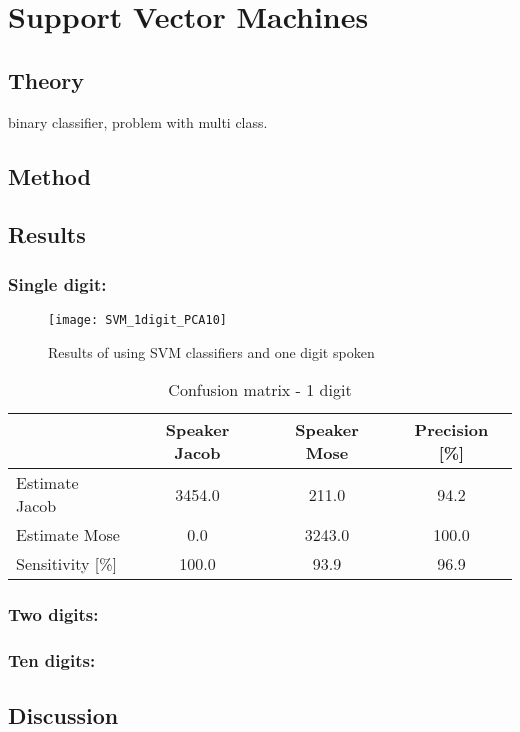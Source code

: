\chapter{Support Vector Machines}
\section{Theory}
binary classifier, problem with multi class. 
\section{Method}

\section{Results}

\subsection{Single digit:}

\begin{figure}[H]
\centering
\texttt{[image: SVM\_1digit\_PCA10]}
\caption{Results of using SVM classifiers and one digit spoken}
\label{fig:Lin_fig_10}
\end{figure}

\begin{table}[H]                                                    
\centering                                                          
\begin{tabular}{|l|c|c|c|}                                          
\hline                                              
  & Speaker Jacob & Speaker Mose & Precision [\%] \\
\hline                                              
Estimate Jacob & 3454.0 & 211.0 & 94.2 \\           
\hline                                              
Estimate Mose & 0.0 & 3243.0 & 100.0 \\             
\hline                                              
Sensitivity [\%] & 100.0 & 93.9 & 96.9 \\           
\hline                                              
\end{tabular}                                       
\caption{Confusion matrix - 1 digit}                
\label{table:SVM_conf_1}                            
\end{table} 

\subsection{Two digits:}

\subsection{Ten digits:}

\section{Discussion}
